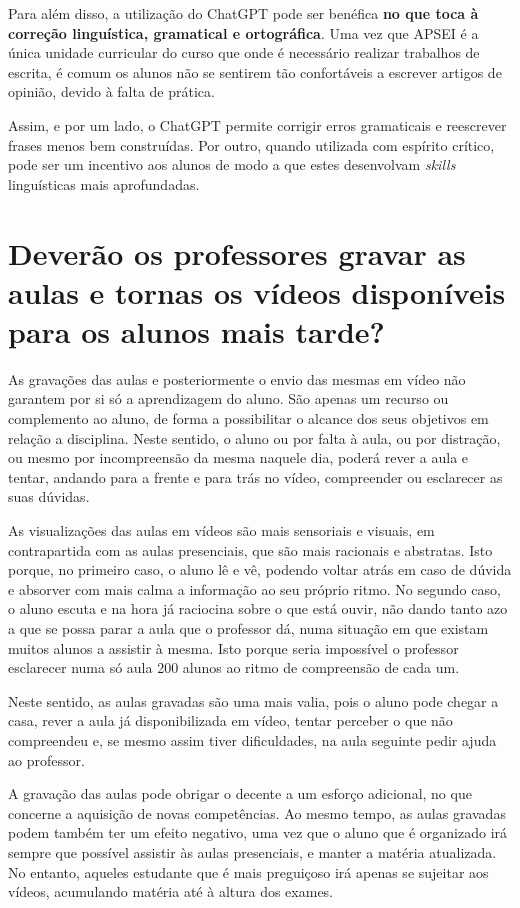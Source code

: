 \documentclass[portuguese, 11pt, a4paper, titlepage, oneside]{article}
\begin{document}
Para além disso, a utilização do ChatGPT pode ser benéfica \textbf{no que toca à correção linguística, gramatical e ortográfica}. Uma vez que APSEI é a única unidade curricular do curso que onde é necessário realizar trabalhos de escrita, é comum os alunos não se sentirem tão confortáveis a escrever artigos de opinião, devido à falta de prática.

Assim, e por um lado, o ChatGPT permite corrigir erros gramaticais e reescrever frases menos bem construídas. Por outro, quando utilizada com espírito crítico, pode ser um incentivo aos alunos de modo a que estes desenvolvam \textit{skills} linguísticas mais aprofundadas.
\pagebreak

\section{Deverão os professores gravar as aulas e tornas os vídeos disponíveis para os alunos mais tarde?}
As gravações das aulas e posteriormente o envio das mesmas em vídeo não garantem por si só a aprendizagem do aluno. São apenas um recurso ou complemento ao aluno, de forma a possibilitar o alcance dos seus objetivos em relação a disciplina. Neste sentido, o aluno ou por falta à aula, ou por distração, ou mesmo por incompreensão da mesma naquele dia, poderá rever a aula e tentar, andando para a frente e para trás no vídeo, compreender ou esclarecer as suas dúvidas.

As visualizações das aulas em vídeos são mais sensoriais e visuais, em contrapartida com as aulas presenciais, que são mais racionais e abstratas. Isto porque, no primeiro caso, o aluno lê e vê, podendo voltar atrás em caso de dúvida e absorver com mais calma a informação ao seu próprio ritmo. No segundo caso, o aluno escuta e na hora já raciocina sobre o que está ouvir, não dando tanto azo a que se possa parar a aula que o professor dá, numa situação em que existam muitos alunos a assistir à mesma. Isto porque seria impossível o professor esclarecer numa só aula 200 alunos ao ritmo de compreensão de cada um.

Neste sentido, as aulas gravadas são uma mais valia, pois o aluno pode chegar a casa, rever a aula já disponibilizada em vídeo, tentar perceber o que não compreendeu e, se mesmo assim tiver dificuldades, na aula seguinte pedir ajuda ao professor.

A gravação das aulas pode obrigar o decente a um esforço adicional, no que concerne a aquisição de novas competências. Ao mesmo tempo, as aulas gravadas podem também ter um efeito negativo, uma vez que o aluno que é organizado irá sempre que possível assistir às aulas presenciais, e manter a matéria atualizada. No entanto, aqueles estudante que é mais preguiçoso irá apenas se sujeitar aos vídeos, acumulando matéria até à altura dos exames.
\end{document}
